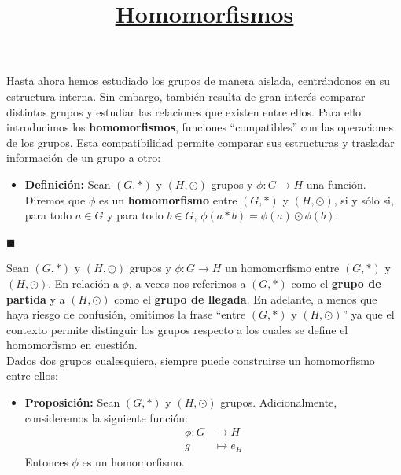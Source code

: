 \documentclass[10 pt]{article}
\title{\textbf{\underline{Homomorfismos}}}
\author{}
\date{}
\begin{document}
\pagestyle{empty}
\maketitle
\thispagestyle{empty}

\section*{}

\Large{Hasta ahora hemos estudiado los grupos de manera aislada, centrándonos en su estructura interna. Sin embargo, también resulta de gran interés comparar distintos grupos y estudiar las relaciones que existen entre ellos. Para ello introducimos los \textbf{homomorfismos}, funciones ``compatibles'' con las operaciones de los grupos. Esta compatibilidad permite comparar sus estructuras y trasladar información de un grupo a otro:} \\

\begin{itemize}
    \item \Large{\textbf{Definición:} Sean $(G,*)$ y $(H,\odot)$ grupos y $\phi:G \rightarrow H$ una función. Diremos que $\phi$ es un \textbf{homomorfismo} entre $(G,*)$ y $(H,\odot)$, si y sólo si, para todo $a \in G$ y para todo $b \in G$, $\phi(a*b)=\phi(a) \odot \phi(b)$.} \\
\end{itemize}

\begin{flushright} 
   $\blacksquare$
\end{flushright}

\Large{Sean $(G,*)$ y $(H,\odot)$ grupos y $\phi:G \rightarrow H$ un homomorfismo entre $(G,*)$ y $(H,\odot)$. En relación a $\phi$, a veces nos referimos a $(G,*)$ como el \textbf{grupo de partida} y a $(H,\odot)$ como el \textbf{grupo de llegada}. En adelante, a menos que haya riesgo de confusión, omitimos la frase ``entre $(G,*)$ y $(H,\odot)$'' ya que el contexto permite distinguir los grupos respecto a los cuales se define el homomorfismo en cuestión.} \\

\Large{Dados dos grupos cualesquiera, siempre puede construirse un homomorfismo entre ellos:} \\ 

\begin{itemize}
    \item \Large{\textbf{Proposición:} Sean $(G,*)$ y $(H,\odot)$ grupos. Adicionalmente, consideremos la siguiente función:}
    \begin{align*}
        \phi:G &\rightarrow H \\
        g &\mapsto e_H
    \end{align*}
    \Large{Entonces $\phi$ es un homomorfismo.} \\
\end{itemize}
\end{document}
